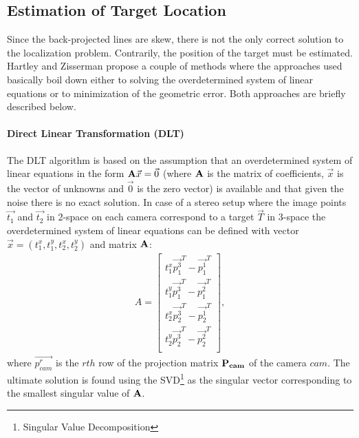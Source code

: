 \subsection{Estimation of Target Location}

Since the back-projected lines are skew, there is not the only correct solution to the localization problem. Contrarily, the position of the target must be estimated. Hartley and Zisserman \cite{Hartley:2003:MVG:861369} propose a couple of methods where the approaches used basically boil down either to solving the overdetermined system of linear equations or to minimization of the geometric error. Both approaches are briefly described below.

\paragraph{Direct Linear Transformation (DLT)} The DLT algorithm is based on the assumption that an overdetermined system of linear equations in the form $\mathbf{A}\vec{x} = \vec{0}$ (where $\mathbf{A}$ is the matrix of coefficients, $\vec{x}$ is the vector of unknowns and $\vec{0}$ is the zero vector) is available and that given the noise there is no exact solution. In case of a stereo setup where the image points $\vec{t_{1}}$ and $\vec{t_{2}}$ in 2-space on each camera correspond to a target $\vec{T}$ in 3-space the overdetermined system of linear equations can be defined with vector $\vec{x} = (t_{1}^{x}, t_{1}^{y}, t_{2}^{x}, t_{2}^{y})$ and matrix $\mathbf{A}$:
\begin{align}
	A = \begin{bmatrix}
		t_{1}^{x}\vec{p_{1}^{3}}^{T} - \vec{p_{1}^{1}}^{T} \\
		t_{1}^{y}\vec{p_{1}^{3}}^{T} - \vec{p_{1}^{2}}^{T} \\
		t_{2}^{x}\vec{p_{2}^{3}}^{T} - \vec{p_{2}^{1}}^{T} \\
		t_{2}^{y}\vec{p_{2}^{3}}^{T} - \vec{p_{2}^{2}}^{T} \\
	\end{bmatrix},
\end{align}
where $\vec{p_{cam}^{r}}$ is the $rth$ row of the projection matrix $\mathbf{P_{cam}}$ of the camera $cam$. The ultimate solution is found using the SVD\footnote{Singular Value Decomposition} as the singular vector corresponding to the smallest singular value of $\mathbf{A}$.

